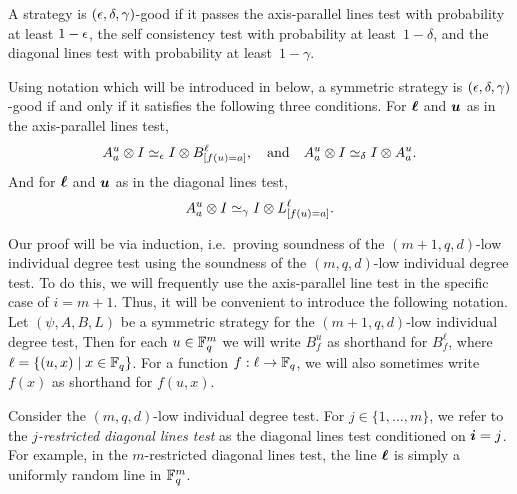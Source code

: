\begin{definition}
A strategy is $(\epsilon, \delta, \gamma)$-good if it
passes the axis-parallel lines test with probability at least $1-\epsilon$,
the self consistency test with probability at least~$1-\delta$,
and the diagonal lines test with probability at least~$1-\gamma$.
\end{definition}

\begin{remark}\label{rem:good-strat-characterization}
Using notation which will be introduced in  below,
a symmetric strategy is $(\epsilon, \delta, \gamma)$-good
if and only if it satisfies the following three conditions.
For $\boldsymbol{\ell}$ and $\boldsymbol{u}$ as in the axis-parallel lines test,
\begin{equation*}
A^u_a \otimes I \simeq_{\epsilon} I \otimes B^{\ell}_{[f(u)=a]},
\quad
\text{and}
\quad
A^u_a \otimes I \simeq_{\delta} I \otimes A^u_a.
\end{equation*}
And for $\boldsymbol{\ell}$ and $\boldsymbol{u}$ as in the diagonal lines test,
\begin{equation*}
A^u_a \otimes I \simeq_{\gamma} I \otimes L^{\ell}_{[f(u)=a]}.
\end{equation*}
\end{remark}

\begin{notation}\label{not:conditioned-on-last-direction}
Our proof will be via induction,
i.e.\ proving soundness of the $(m+1,q,d)$-low individual degree test
using the soundness of the $(m,q,d)$-low individual degree test.
To do this, we will frequently use the axis-parallel line test in the specific case of $i = m+1$.
Thus, it will be convenient to introduce the following notation.
Let $(\psi, A, B, L)$ be a symmetric strategy for the $(m+1, q, d)$-low individual degree test,
Then for each $u \in \mathbb F_q^m$ we will write $B^u_f$ as shorthand for $B^{\ell}_f$,
where $\ell = \{(u, x) \mid x \in \mathbb F_q\}$.
For a function $f:\ell \rightarrow \mathbb F_q$,
we will also sometimes write $f(x)$ as shorthand for $f(u,x)$.
\end{notation}

\begin{definition}
Consider the $(m,q,d)$-low individual degree test.
For $j \in \{1, \ldots, m\}$,
we refer to the \emph{$j$-restricted diagonal lines test}
as the diagonal lines test conditioned on $\boldsymbol{i} = j$.
For example, in the $m$-restricted diagonal lines test,
the line $\boldsymbol{\ell}$ is simply a uniformly random line in $\mathbb F_q^m$.
\end{definition}

